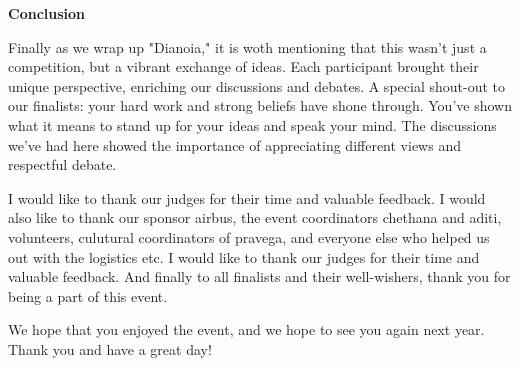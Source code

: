 \documentclass{report}
\begin{document}
\begin{center}
    \large
    \textbf{Conclusion}
\end{center}

Finally as we wrap up "Dianoia," it is woth mentioning that this wasn't just a competition, but a vibrant exchange of ideas. 
Each participant brought their unique perspective, enriching our discussions and debates.
A special shout-out to our finalists: your hard work and strong beliefs have shone through. You've shown what it means to stand up for 
your ideas and speak your mind.
The discussions we've had here showed the importance of appreciating different views and respectful debate.

I would like to thank our judges for their time and valuable feedback.
I would also like to thank our sponsor airbus, the event coordinators chethana and aditi, volunteers, culutural coordinators of pravega, and everyone else
who helped us out with the logistics etc.
I would like to thank our judges for their time and valuable feedback.
And finally to all finalists and their well-wishers, thank you for being a part of this event.

We hope that you enjoyed the event, and we hope to see you again next year.
Thank you and have a great day!
\end{document}
